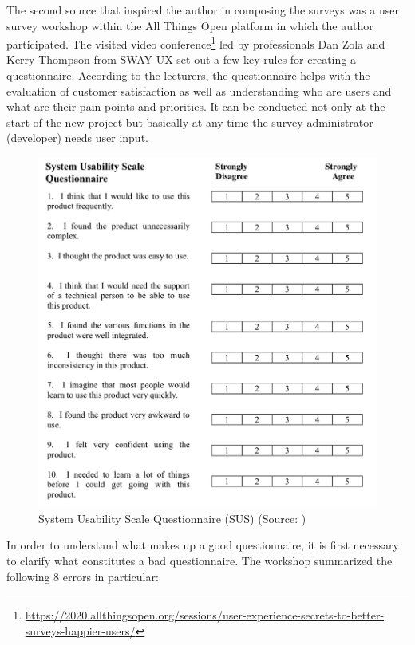 \documentclass[a4paper,10pt,twoside]{article}
\begin{document}
The second source that inspired the author in composing the surveys was a user survey workshop within the All Things Open platform in which the author participated. The visited video conference\footnote{\url{https://2020.allthingsopen.org/sessions/user-experience-secrets-to-better-surveys-happier-users/}} led by professionals Dan Zola and Kerry Thompson from SWAY UX set out a few key rules for creating a questionnaire. According to the lecturers, the questionnaire helps with the evaluation of customer satisfaction as well as understanding who are users and what are their pain points and priorities. It can be conducted not only at the start of the new project but basically at any time the survey administrator (developer) needs user input.

\vspace{0.3cm}
\begin{figure}[hbt!] 
\begin{center}
\includegraphics[width=14cm]{../pictures/sus.png} 
\caption[System Usability Scale Questionnaire (SUS) ]{System Usability Scale Questionnaire (SUS) (Source: \cite{sus})}
\label{fig:sus}
\end{center}
\end{figure}

\newpage
\noindent In order to understand what makes up a good questionnaire, it is first necessary to clarify what constitutes a bad questionnaire. The workshop summarized the following 8 errors in particular:
\end{document}
